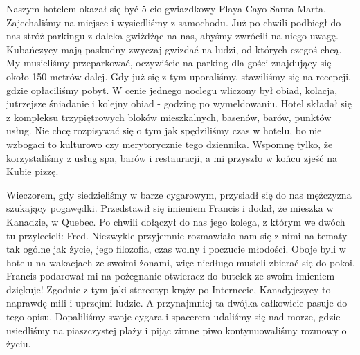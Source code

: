 \noindent Naszym hotelem okazał się być 5-cio gwiazdkowy Playa Cayo Santa Marta.
Zajechaliśmy na miejsce i wysiedliśmy z samochodu.
Już po chwili podbiegł do nas stróż parkingu z daleka gwiżdżąc na nas, abyśmy zwrócili na niego uwagę.
Kubańczycy mają paskudny zwyczaj gwizdać na ludzi, od których czegoś chcą.
My musieliśmy przeparkować, oczywiście na parking dla gości znajdujący się około 150 metrów dalej.
Gdy już się z tym uporaliśmy, stawiliśmy się na recepcji, gdzie opłaciliśmy pobyt.
W cenie jednego noclegu wliczony był obiad, kolacja, jutrzejsze śniadanie i kolejny obiad - godzinę po wymeldowaniu.
Hotel składał się z kompleksu trzypiętrowych bloków mieszkalnych, basenów, barów, punktów usług.
Nie chcę rozpisywać się o tym jak spędziliśmy czas w hotelu, bo nie wzbogaci to kulturowo czy merytorycznie tego dziennika.
Wspomnę tylko, że korzystaliśmy z usług spa, barów i restauracji, a mi przyszło w końcu zjeść na Kubie pizzę.
\par Wieczorem, gdy siedzieliśmy w barze cygarowym, przysiadł się do nas mężczyzna szukający pogawędki.
Przedstawił się imieniem Francis i dodał, że mieszka w Kanadzie, w Quebec.
Po chwili dołączył do nas jego kolega, z którym we dwóch tu przylecieli: Fred.
Niezwykle przyjemnie rozmawiało nam się z nimi na tematy tak ogólne jak życie, jego filozofia, czas wolny i poczucie młodości.
Oboje byli w hotelu na wakacjach ze swoimi żonami, więc niedługo musieli zbierać się do pokoi.
Francis podarował mi na pożegnanie otwieracz do butelek ze swoim imieniem - dziękuje!
Zgodnie z tym jaki stereotyp krąży po Internecie, Kanadyjczycy to naprawdę mili i uprzejmi ludzie.
A przynajmniej ta dwójka całkowicie pasuje do tego opisu.
Dopaliliśmy swoje cygara i spacerem udaliśmy się nad morze, gdzie usiedliśmy na piaszczystej plaży i pijąc zimne piwo kontynuowaliśmy rozmowy o życiu.